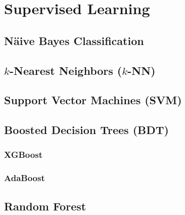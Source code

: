 \section{Supervised Learning}
\label{ml:supervised}

\subsection{N{\"a}ive Bayes Classification}
\label{ml:supervised:Bayes}

\subsection{\texorpdfstring{$k$}{k}-Nearest Neighbors (\texorpdfstring{$k$}{k}-NN)}
\label{ml:supervised:kNN}

\subsection{Support Vector Machines (SVM)}
\label{ml:supervised:SVM}

\subsection{Boosted Decision Trees (BDT)}
\label{ml:supervised:BDT}

\subsubsection{XGBoost}%
\label{ml:supervised:BDT:xgboost}
\xgboost \cite{xgboost}

\subsubsection{AdaBoost}
\label{ml:supervised:BDT:AdaBoost}

\subsection{Random Forest}
\label{ml:supervised:RF}

